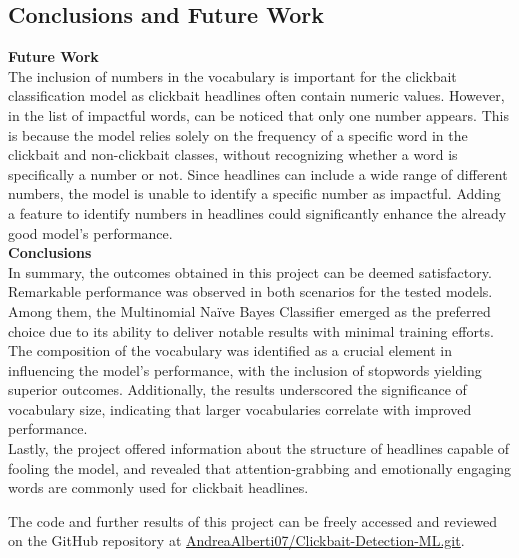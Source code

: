 \documentclass{article}
\begin{document}
\begin{multicols}{2}
\section{Conclusions and Future Work}
\textbf{Future Work}\\
The inclusion of numbers in the vocabulary is important for the clickbait classification model as clickbait headlines 
often contain numeric values. However, in the list of impactful words, can be noticed that only one number appears.
This is because the model relies solely on the frequency of a specific word in the clickbait and 
non-clickbait classes, without recognizing whether a word is specifically a number or not. Since headlines 
can include a wide range of different numbers, the model is unable to identify a specific number as impactful.
Adding a feature to identify numbers in headlines could significantly enhance the already good model's performance.\\

\noindent
\textbf{Conclusions}\\
In summary, the outcomes obtained in this project can be deemed satisfactory. Remarkable performance was 
observed in both scenarios for the tested models. Among them, the Multinomial Naïve Bayes Classifier emerged 
as the preferred choice due to its ability to deliver notable results with minimal training efforts. 
The composition of the vocabulary was identified as a crucial element in influencing the model's performance, 
with the inclusion of stopwords yielding superior outcomes. Additionally, the results underscored the significance 
of vocabulary size, indicating that larger vocabularies correlate with improved performance.\\
Lastly, the project offered information about the structure of headlines capable of fooling the model, 
and revealed that attention-grabbing and emotionally engaging words are commonly used for clickbait headlines.

\noindent
The code and further results of this project can be freely accessed and reviewed on the GitHub repository at 
\href{https://github.com/AndreaAlberti07/Clickbait-Detection-ML.git}{\underline{AndreaAlberti07/Clickbait-Detection-ML.git}}.\\








\end{multicols}
\end{document}
